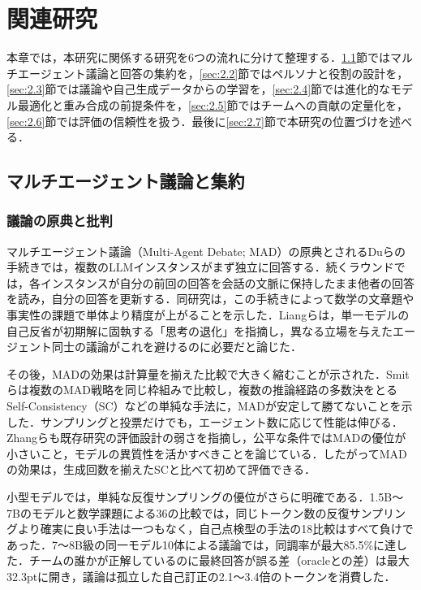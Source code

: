 

\chapter{関連研究}
\label{cha:2}

本章では，本研究に関係する研究を6つの流れに分けて整理する．\ref{sec:2.1}節ではマルチエージェント議論と回答の集約を，\ref{sec:2.2}節ではペルソナと役割の設計を，\ref{sec:2.3}節では議論や自己生成データからの学習を，\ref{sec:2.4}節では進化的なモデル最適化と重み合成の前提条件を，\ref{sec:2.5}節ではチームへの貢献の定量化を，\ref{sec:2.6}節では評価の信頼性を扱う．最後に\ref{sec:2.7}節で本研究の位置づけを述べる．

\section{マルチエージェント議論と集約}
\label{sec:2.1}

\subsection{議論の原典と批判}
\label{sec:2.1.1}

マルチエージェント議論（Multi-Agent Debate; MAD）の原典とされるDuら\cite{du2023improving}の手続きでは，複数のLLMインスタンスがまず独立に回答する．続くラウンドでは，各インスタンスが自分の前回の回答を会話の文脈に保持したまま他者の回答を読み，自分の回答を更新する．同研究は，この手続きによって数学の文章題や事実性の課題で単体より精度が上がることを示した．Liangら\cite{liang2023encouraging}は，単一モデルの自己反省が初期解に固執する「思考の退化」を指摘し，異なる立場を与えたエージェント同士の議論がこれを避けるのに必要だと論じた．

その後，MADの効果は計算量を揃えた比較で大きく縮むことが示された．Smitら\cite{smit2024should}は複数のMAD戦略を同じ枠組みで比較し，複数の推論経路の多数決をとるSelf-Consistency（SC）\cite{wang2023selfconsistency}などの単純な手法に，MADが安定して勝てないことを示した．サンプリングと投票だけでも，エージェント数に応じて性能は伸びる\cite{li2024more}．Zhangら\cite{zhang2025debate}も既存研究の評価設計の弱さを指摘し，公平な条件ではMADの優位が小さいこと，モデルの異質性を活かすべきことを論じている．したがってMADの効果は，生成回数を揃えたSCと比べて初めて評価できる．

小型モデルでは，単純な反復サンプリングの優位がさらに明確である．1.5B〜7Bのモデルと数学課題による36の比較では，同じトークン数の反復サンプリングより確実に良い手法は一つもなく，自己点検型の手法の18比較はすべて負けであった\cite{mirzaei2026samplemore}．7〜8B級の同一モデル10体による議論では，同調率が最大85.5\%に達した．チームの誰かが正解しているのに最終回答が誤る差（oracleとの差）は最大32.3ptに開き，議論は孤立した自己訂正の2.1〜3.4倍のトークンを消費した\cite{cost2026consensus}．

